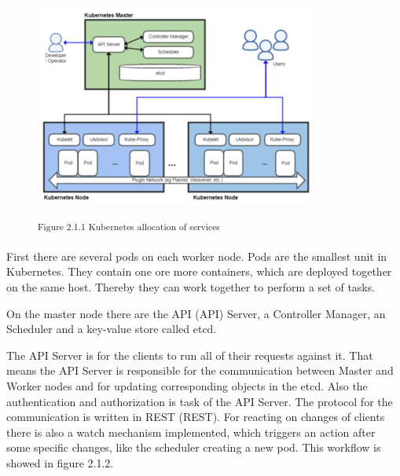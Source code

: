 \begin{figure}[h]
\centering
\includegraphics[width=\textwidth/5*3]{images/kubernetes_service_allocation.png}

\textsuperscript{Figure 2.1.1 Kubernetes allocation of services}
\end{figure}

First there are several pods on each worker node. Pods are the smallest unit in Kubernetes. They contain one ore more containers, which are deployed together on the same host. Thereby they can work together to perform a set of tasks.%

On the master node there are the \acs{API} (\acl{API}) Server, a Controller Manager, an Scheduler and a key-value store called etcd.

The API Server is for the clients to run all of their requests against it. That means the API Server is responsible for the communication between Master and Worker nodes and for updating corresponding objects in the etcd. Also the authentication and authorization is task of the API Server. The protocol for the communication is written in \acs{REST} (\acl{REST}). For reacting on changes of clients there is also a watch mechanism implemented, which triggers an action after some specific changes, like the scheduler creating a new pod. This workflow is showed in figure 2.1.2.

